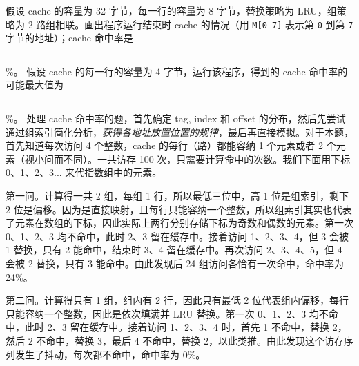 \begin{problems}
        \qn 假设 cache 的容量为 32 字节，每一行的容量为 8 字节，替换策略为 LRU，组策略为 2 路组相联。画出程序运行结束时 cache 的情况（用 \verb|M[0-7]| 表示第 \verb|0| 到第 \verb|7| 字节的地址）；cache 命中率是 \rule{2.5cm}{0.25mm}\%。
        \qn 假设 cache 的每一行的容量为 4 字节，运行该程序，得到的 cache 命中率的可能最大值为 \rule{2.5cm}{0.25mm}\%。
        \sol 处理 cache 命中率的题，首先确定 tag, index 和 offset 的分布，然后先尝试通过组索引简化分析，\emph{获得各地址放置位置的规律}，最后再直接模拟。对于本题，首先知道每次访问 4 个整数，cache 的每行（路）都能容纳 1 个元素或者 2 个元素（视小问而不同）。一共访存 100 次，只需要计算命中的次数。我们下面用下标 0、1、2、3... 来代指数组中的元素。

        第一问。计算得一共 2 组，每组 1 行，所以最低三位中，高 1 位是组索引，剩下 2 位是偏移。因为是直接映射，且每行只能容纳一个整数，所以组索引其实也代表了元素在数组的下标，因此实际上两行分别存储下标为奇数和偶数的元素。第一次 0、1、2、3 均不命中，此时 2、3 留在缓存中。接着访问 1、2、3、4，但 3 会被 1 替换，只有 2 能命中，结束时 3、4 留在缓存中。再次访问 2、3、4、5，但 4 会被 2 替换，只有 3 能命中。由此发现后 24 组访问各恰有一次命中，命中率为 24\%。

        第二问。计算得只有 1 组，组内有 2 行，因此只有最低 2 位代表组内偏移，每行只能容纳一个整数，因此是依次填满并 LRU 替换。第一次 0、1、2、3 均不命中，此时 2、3 留在缓存中。接着访问 1、2、3、4 时，首先 1 不命中，替换 2，然后 2 不命中，替换 3，最后 4 不命中，替换 2，以此类推。由此发现这个访存序列发生了抖动，每次都不命中，命中率为 0\%。


\end{problems}
